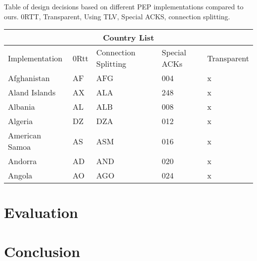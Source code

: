 \documentclass[a4paper,english, 11pt]{report}
\begin{document}
{Table of design decisions based on different PEP implementations compared to ours.}
{0RTT, Transparent, Using TLV, Special ACKS, connection splitting.}\\
\begin{tabular}{ |p{4cm}||p{2cm}|p{2cm}|p{2cm}|p{2cm}| }
 \hline
 \multicolumn{5}{|c|}{Country List} \\
 \hline
 Implementation& 0Rtt &Connection Splitting &Special ACKs &Transparent\\
 \hline
 Afghanistan   & AF    &AFG&   004 & x\\
 Aland Islands&   AX  & ALA   &248 & x\\
 Albania &AL & ALB&  008 & x\\
 Algeria    &DZ & DZA&  012& x \\
 American Samoa&   AS  & ASM&016& x\\
 Andorra& AD  & AND   &020& x\\
 Angola& AO  & AGO&024& x\\
 \hline
\end{tabular}

\chapter{Evaluation}
\chapter{Conclusion}

{}

\end{document}
